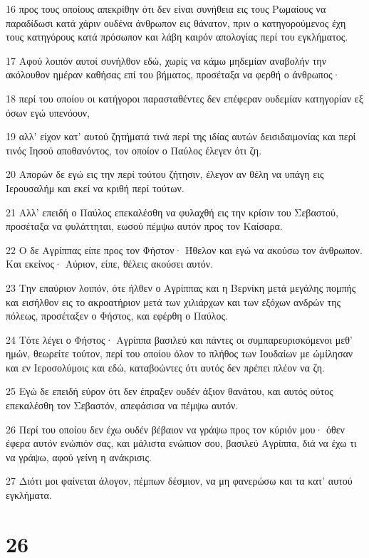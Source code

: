 \par 16 προς τους οποίους απεκρίθην ότι δεν είναι συνήθεια εις τους Ρωμαίους να παραδίδωσι κατά χάριν ουδένα άνθρωπον εις θάνατον, πριν ο κατηγορούμενος έχη τους κατηγόρους κατά πρόσωπον και λάβη καιρόν απολογίας περί του εγκλήματος.
\par 17 Αφού λοιπόν αυτοί συνήλθον εδώ, χωρίς να κάμω μηδεμίαν αναβολήν την ακόλουθον ημέραν καθήσας επί του βήματος, προσέταξα να φερθή ο άνθρωπος·
\par 18 περί του οποίου οι κατήγοροι παρασταθέντες δεν επέφεραν ουδεμίαν κατηγορίαν εξ όσων εγώ υπενόουν,
\par 19 αλλ' είχον κατ' αυτού ζητήματά τινά περί της ιδίας αυτών δεισιδαιμονίας και περί τινός Ιησού αποθανόντος, τον οποίον ο Παύλος έλεγεν ότι ζη.
\par 20 Απορών δε εγώ εις την περί τούτου ζήτησιν, έλεγον αν θέλη να υπάγη εις Ιερουσαλήμ και εκεί να κριθή περί τούτων.
\par 21 Αλλ' επειδή ο Παύλος επεκαλέσθη να φυλαχθή εις την κρίσιν του Σεβαστού, προσέταξα να φυλάττηται, εωσού πέμψω αυτόν προς τον Καίσαρα.
\par 22 Ο δε Αγρίππας είπε προς τον Φήστον· Ήθελον και εγώ να ακούσω τον άνθρωπον. Και εκείνος· Αύριον, είπε, θέλεις ακούσει αυτόν.
\par 23 Την επαύριον λοιπόν, ότε ήλθεν ο Αγρίππας και η Βερνίκη μετά μεγάλης πομπής και εισήλθον εις το ακροατήριον μετά των χιλιάρχων και των εξόχων ανδρών της πόλεως, προσέταξεν ο Φήστος, και εφέρθη ο Παύλος.
\par 24 Τότε λέγει ο Φήστος· Αγρίππα βασιλεύ και πάντες οι συμπαρευρισκόμενοι μεθ' ημών, θεωρείτε τούτον, περί του οποίου όλον το πλήθος των Ιουδαίων με ώμίλησαν και εν Ιεροσολύμοις και εδώ, καταβοώντες ότι αυτός δεν πρέπει πλέον να ζη.
\par 25 Εγώ δε επειδή εύρον ότι δεν έπραξεν ουδέν άξιον θανάτου, και αυτός ούτος επεκαλέσθη τον Σεβαστόν, απεφάσισα να πέμψω αυτόν.
\par 26 Περί του οποίου δεν έχω ουδέν βέβαιον να γράψω προς τον κύριόν μου· όθεν έφερα αυτόν ενώπιόν σας, και μάλιστα ενώπιον σου, βασιλεύ Αγρίππα, διά να έχω τι να γράψω, αφού γείνη η ανάκρισις.
\par 27 Διότι μοι φαίνεται άλογον, πέμπων δέσμιον, να μη φανερώσω και τα κατ' αυτού εγκλήματα.

\chapter{26}

